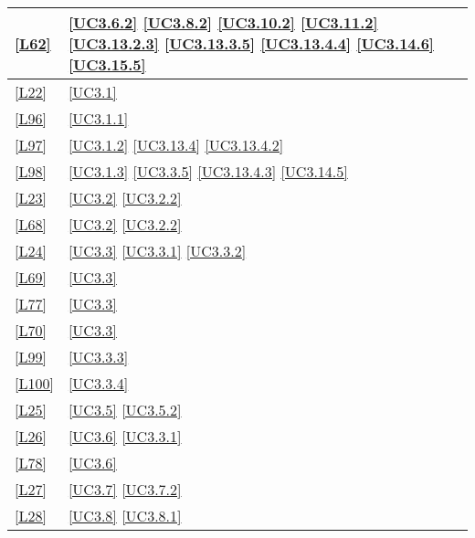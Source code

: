 \begin{longtable}{|P{6cm}|P{6cm}|}
	\hline \ref{L62} & \ref{UC3.6.2} \linebreak \ref{UC3.8.2} \linebreak \ref{UC3.10.2} \linebreak \ref{UC3.11.2} \linebreak \ref{UC3.13.2.3} \linebreak \ref{UC3.13.3.5}  \linebreak \ref{UC3.13.4.4} \linebreak \ref{UC3.14.6} \linebreak \ref{UC3.15.5}\\
	\hline \ref{L22} & \ref{UC3.1} \\
	\hline \ref{L96} & \ref{UC3.1.1} \\
	\hline \ref{L97} & \ref{UC3.1.2} \linebreak \ref{UC3.13.4} \ref{UC3.13.4.2} \\
	\hline \ref{L98} & \ref{UC3.1.3} \linebreak \ref{UC3.3.5} \linebreak \ref{UC3.13.4.3} \linebreak \ref{UC3.14.5} \\
	\hline \ref{L23} & \ref{UC3.2} \linebreak \ref{UC3.2.2}\\
	\hline \ref{L68} & \ref{UC3.2} \linebreak \ref{UC3.2.2} \\
	\hline \ref{L24} & \ref{UC3.3} \linebreak \ref{UC3.3.1} \linebreak \ref{UC3.3.2}\\
	\hline \ref{L69} & \ref{UC3.3} \\
	\hline \ref{L77} & \ref{UC3.3} \\
	\hline \ref{L70} & \ref{UC3.3} \\
	\hline \ref{L99} & \ref{UC3.3.3} \\
	\hline \ref{L100} & \ref{UC3.3.4} \\
	\hline \ref{L25} & \ref{UC3.5} \linebreak \ref{UC3.5.2}\\
	\hline \ref{L26} & \ref{UC3.6} \linebreak \ref{UC3.3.1}\\
	\hline \ref{L78} & \ref{UC3.6} \\
	\hline \ref{L27} & \ref{UC3.7} \linebreak \ref{UC3.7.2}\\
	\hline \ref{L28} & \ref{UC3.8} \linebreak \ref{UC3.8.1}\\

\end{longtable}
